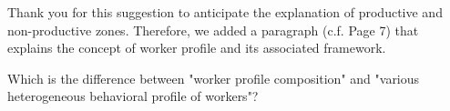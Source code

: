 \documentclass[preprint,11pt,3p]{elsarticle}
\begin{document}
\begin{tcolorbox}[colback=r_color1,colframe=r_color2,title=Response Q4 :]
	Thank you for this suggestion to anticipate the explanation of productive and non-productive zones. 
	Therefore, we added a paragraph (c.f. Page 7) that explains the concept of worker profile and its associated framework.
			
	
		
		
					
\end{tcolorbox}
\begin{tcolorbox}[colback=q_color1,colframe=q_color2,title=Q5  :]	
	Which is the difference between "worker profile composition" and "various heterogeneous behavioral profile of workers"?
	 
\end{tcolorbox}
\end{document}
